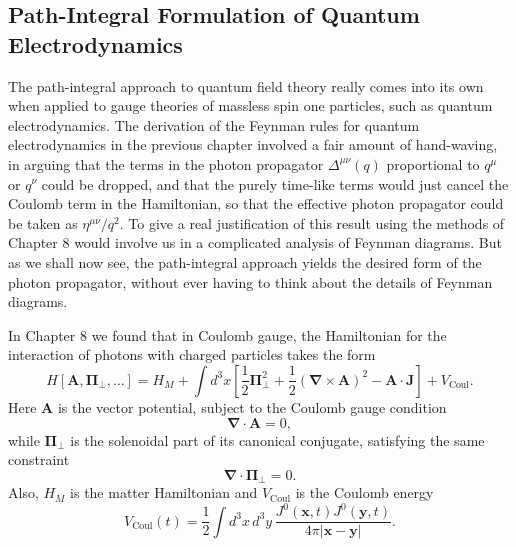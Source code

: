 
\subsection{Path-Integral Formulation of Quantum Electrodynamics}

The path-integral approach to quantum field theory really comes into its own
when applied to gauge theories of massless spin one particles, such as quantum
electrodynamics. The derivation of the Feynman rules for quantum
electrodynamics in the previous chapter involved a fair amount of hand-waving,
in arguing that the terms in the photon propagator $\Delta^{\mu\nu}(q)$
proportional to $q^\mu$ or $q^\nu$ could be dropped, and that the purely
time-like terms would just cancel the Coulomb term in the Hamiltonian, so that
the effective photon propagator could be taken as $\eta^{\mu\nu}/q^2$. To give
a real justification of this result using the methods of Chapter 8 would
involve us in a complicated analysis of Feynman diagrams. But as we shall now
see, the path-integral approach yields the desired form of the photon
propagator, without ever having to think about the details of Feynman diagrams.

In Chapter 8 we found that in Coulomb gauge, the Hamiltonian for the interaction
of photons with charged particles takes the form
\begin{equation}
H[\mathbf A,\boldsymbol\Pi_\perp,\ldots]
=H_M+\int d^3x\left[\frac12\boldsymbol\Pi_\perp^2
 +\frac12(\boldsymbol\nabla\times\mathbf A)^2-\mathbf A\cdot\mathbf J\right]
 +V_{\mathrm{Coul}}.
\tag{9.6.1}\label{eq:9.6.1}
\end{equation}
Here $\mathbf A$ is the vector potential, subject to the Coulomb gauge condition
\begin{equation}
\boldsymbol\nabla\cdot\mathbf A=0,
\tag{9.6.2}\label{eq:9.6.2}
\end{equation}
while $\boldsymbol\Pi_\perp$ is the solenoidal part of its canonical conjugate,
satisfying the same constraint
\begin{equation}
\boldsymbol\nabla\cdot\boldsymbol\Pi_\perp=0.
\tag{9.6.3}\label{eq:9.6.3}
\end{equation}
Also, $H_M$ is the matter Hamiltonian and $V_{\mathrm{Coul}}$ is the Coulomb
energy
\begin{equation}
V_{\mathrm{Coul}}(t)=\frac12\int d^3x\,d^3y\,
 \frac{J^0(\mathbf{x},t)J^0(\mathbf{y},t)}{4\pi|\mathbf{x}-\mathbf{y}|}.
\tag{9.6.4}\label{eq:9.6.4}
\end{equation}

